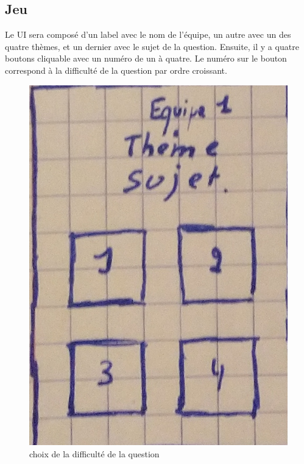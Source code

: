 \newpage
\subsection{Jeu}
Le UI sera composé d'un label avec le nom de l'équipe, un autre avec un des quatre thèmes, et un dernier avec le sujet de la question. Ensuite, il y a quatre boutons cliquable avec un numéro de un à quatre. Le numéro sur le bouton correspond 
à la difficulté de la question par ordre croissant.
\begin{figure}[ht]
	\centering
	\includegraphics[scale=0.5]{jeux.png}
	\caption{choix de la difficulté de la question}
	\label{interface jeu}
\end{figure}

\newpage
